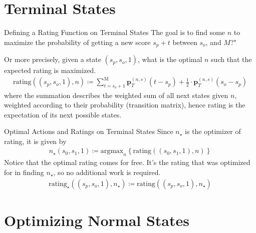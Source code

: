 \documentclass{beamer}
\begin{document}
\section{Terminal States}

\begin{frame}{Defining a Rating Function on Terminal States}
    The goal is to find some $n$ to maximize the probability of getting a new score $s_p + t$ between $s_o$, and $M$?"

    Or more precisely, given a state $(s_p, s_o, 1)$, what is the optimal $n$ such that the expected rating is maximized.
    \begin{align*}
        \text{rating}((s_p, s_o, 1), n) \coloneqq \sum_{t = s_o+1}^{\text{M}} \textbf{p}_{T}^{(n, s)}(t - s_p) + \frac{1}{2} \cdot \textbf{p}_{T}^{(n, s)}(s_o - s_p)
    \end{align*}
    where the summation describes the weighted sum of all next states given $n$, weighted according to their probability (transition matrix), hence rating is the expectation of its next possible states.
\end{frame}

\begin{frame}{Optimal Actions and Ratings on Terminal States}
    Since $n_{\star}$ is the optimizer of rating, it is given by
    \begin{align*}
        n_{\star}(s_0, s_1, 1) \coloneqq \text{argmax}_n \left\{ \text{rating}((s_0, s_1, 1), n) \right\}
    \end{align*}
    Notice that the optimal rating comes for free. It's the rating that was optimized for in finding $n_{\star}$, so no additional work is required.
    \begin{align*}
        \text{rating}_{\star}((s_p, s_o, 1), n_{\star}) \coloneqq \text{rating}((s_p, s_o, 1), n_{\star})
    \end{align*}
\end{frame}

\section{Optimizing Normal States}
\end{document}
